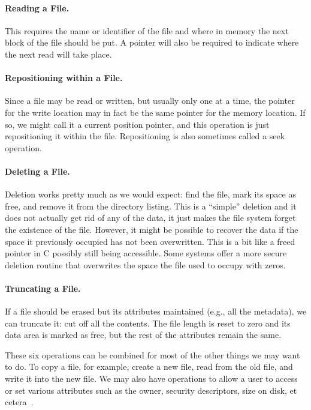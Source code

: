 \paragraph{Reading a File.} This requires the name or identifier of the file and where in memory the next block of the file should be put. A pointer will also be required to indicate where the next read will take place. 

\paragraph{Repositioning within a File.} Since a file may be read or written, but usually only one at a time, the pointer for the write location may in fact be the same pointer for the memory location. If so, we might call it a current position pointer, and this operation is just repositioning it within the file. Repositioning is also sometimes called a seek operation.

\paragraph{Deleting a File.} Deletion works pretty much as we would expect: find the file, mark its space as free, and remove it from the directory listing. This is a ``simple'' deletion and it does not actually get rid of any of the data, it just makes the file system forget the existence of the file. However, it might be possible to recover the data if the space it previously occupied has not been overwritten. This is a bit like a freed pointer in C possibly still being accessible. Some systems offer a more secure deletion routine that overwrites the space the file used to occupy with zeros.

\paragraph{Truncating a File.} If a file should be erased but its attributes maintained (e.g., all the metadata), we can truncate it: cut off all the contents. The file length is reset to zero and its data area is marked as free, but the rest of the attributes remain the same.


These six operations can be combined for most of the other things we may want to do. To copy a file, for example, create a new file, read from the old file, and write it into the new file. We may also have operations to allow a user to access or set various attributes such as the owner, security descriptors, size on disk, et cetera~\cite{osc}.

